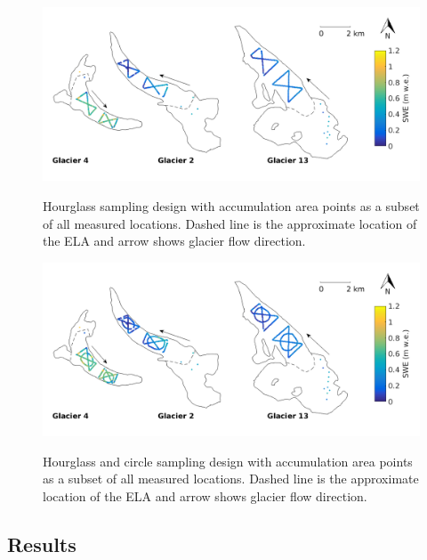 \documentclass[12pt]{article}
\begin{document}
\begin{figure}[H]
	\centering
	\includegraphics[width =\textwidth]{SamplingDesign_Ahourglass.png}\\
	\caption{Hourglass sampling design with accumulation area points as a subset of all measured locations. Dashed line is the approximate location of the ELA and arrow shows glacier flow direction.}
	\label{fig:SamplingDesign_Ahourglass}
\end{figure}

\begin{figure}[H]
	\centering
	\includegraphics[width =\textwidth]{SamplingDesign_AhourglassCircle.png}\\
	\caption{Hourglass and circle sampling design with accumulation area points as a subset of all measured locations. Dashed line is the approximate location of the ELA and arrow shows glacier flow direction.}
	\label{fig:SamplingDesign_AhourglassCircle}
\end{figure}

	
	


\subsection{Results}
\end{document}
